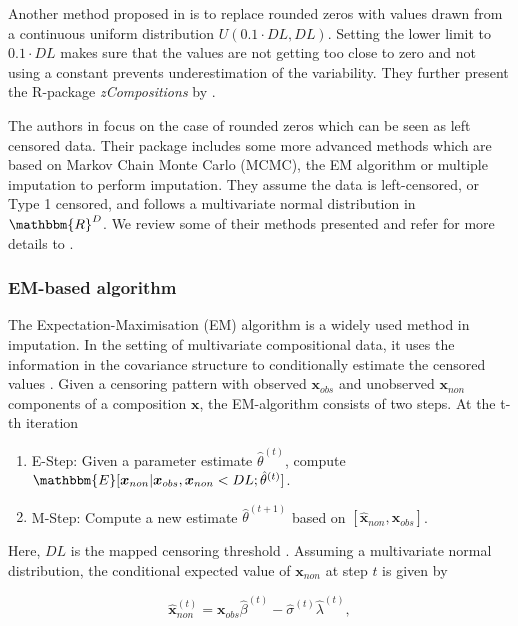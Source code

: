 Another method proposed in \cite{Lubbe:2021} is to replace rounded zeros with values drawn from a continuous uniform distribution $U(0.1\cdot DL,DL)$. Setting the lower limit to $0.1\cdot DL$ makes sure that the values are not getting too close to zero and not using a constant prevents underestimation of the variability. They further present the R-package \textit{zCompositions} by \cite{Palarea-Albaladejo:2015}. 

The authors in \cite{Palarea-Albaladejo:2015} focus on the case of rounded zeros which can be seen as left censored data. Their package includes some more advanced methods which are based on Markov Chain Monte Carlo (MCMC), the EM algorithm or multiple imputation to perform imputation. They assume the data is left-censored, or Type 1 censored, and follows a multivariate normal distribution in $\mathbbm{R}^D$. We review some of their methods presented and refer for more details to \cite{Palarea-Albaladejo:2015}.

\subsubsection{EM-based algorithm}
\label{sec:EM Algorithm}

The Expectation-Maximisation (EM) algorithm \cite{Dempster:1977} is a widely used method in imputation. In the setting of multivariate compositional data, it uses the information in the covariance structure to conditionally estimate the censored values \cite{Palarea-Albaladejo:2015}. Given a censoring pattern with observed $\bm{x}_{obs}$ and unobserved $\bm{x}_{non}$ components of a composition $\bm{x}$, the EM-algorithm consists of two steps. At the t-th iteration

\begin{enumerate}
	\item E-Step: Given a parameter estimate $\hat{\theta}^{(t)}$, compute $\mathbbm{E}[\bm{x}_{non}|\bm{x}_{obs},\bm{x}_{non} < DL; \hat{\theta}^{(t)}]$.
	\item M-Step: Compute a new estimate $\hat{\theta}^{(t+1)}$ based on $[\hat{\bm{x}}_{non},\bm{x}_{obs}]$.
\end{enumerate}

Here, $DL$ is the mapped censoring threshold \cite{Palarea-Albaladejo:2015}. Assuming a multivariate normal distribution, the conditional expected value of $\bm{x}_{non}$ at step $t$ is given by

\begin{equation}
\hat{\bm{x}}_{non}^{(t)} = \bm{x}_{obs}\hat{\beta}^{(t)} - \hat{\sigma}^{(t)}\hat{\lambda}^{(t)},
\label{eq:E-step}
\end{equation}

